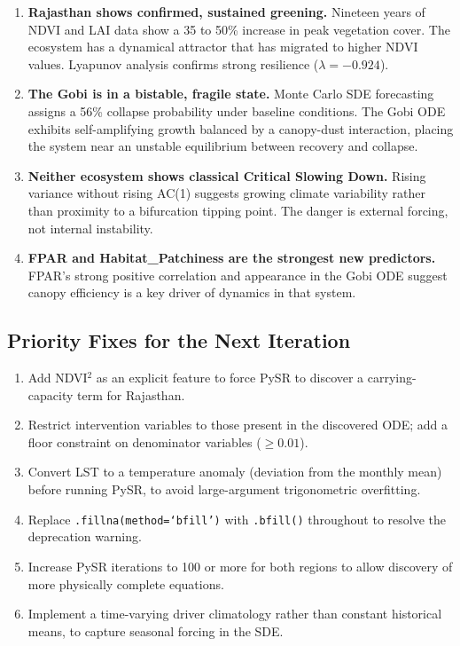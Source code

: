 \documentclass[12pt, a4paper]{article}
\begin{document}
\begin{enumerate}
    \item \textbf{Rajasthan shows confirmed, sustained greening.}
    Nineteen years of NDVI and LAI data show a 35 to 50\% increase in
    peak vegetation cover. The ecosystem has a dynamical attractor that
    has migrated to higher NDVI values. Lyapunov analysis confirms strong
    resilience ($\lambda = -0.924$).

    \item \textbf{The Gobi is in a bistable, fragile state.}
    Monte Carlo SDE forecasting assigns a 56\% collapse probability under
    baseline conditions. The Gobi ODE exhibits self-amplifying growth
    balanced by a canopy-dust interaction, placing the system near an
    unstable equilibrium between recovery and collapse.

    \item \textbf{Neither ecosystem shows classical Critical Slowing
    Down.} Rising variance without rising AC(1) suggests growing climate
    variability rather than proximity to a bifurcation tipping point.
    The danger is external forcing, not internal instability.

    \item \textbf{FPAR and Habitat\_Patchiness are the strongest new
    predictors.} FPAR's strong positive correlation and appearance in the
    Gobi ODE suggest canopy efficiency is a key driver of dynamics in
    that system.
\end{enumerate}

\subsection{Priority Fixes for the Next Iteration}

\begin{enumerate}
    \item Add NDVI$^2$ as an explicit feature to force PySR to discover a
    carrying-capacity term for Rajasthan.
    \item Restrict intervention variables to those present in the
    discovered ODE; add a floor constraint on denominator variables
    ($\geq 0.01$).
    \item Convert LST to a temperature anomaly (deviation from the monthly
    mean) before running PySR, to avoid large-argument trigonometric
    overfitting.
    \item Replace \texttt{.fillna(method=`bfill')} with \texttt{.bfill()}
    throughout to resolve the deprecation warning.
    \item Increase PySR iterations to 100 or more for both regions to
    allow discovery of more physically complete equations.
    \item Implement a time-varying driver climatology rather than constant
    historical means, to capture seasonal forcing in the SDE.
\end{enumerate}
\end{document}
